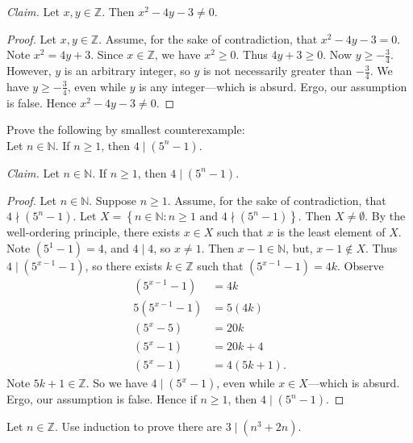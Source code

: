 \documentclass{article}
\newcommand{\Z}{\mathbb{Z}}
\theoremstyle{definition}
\begin{document}
\begin{solution}
\newline

\noindent\textit{Claim. }Let $x,y\in\Z$. Then $x^2-4y-3\neq 0$.
\begin{proof}
Let $x,y\in\Z$. Assume, for the sake of contradiction, that $x^2-4y-3=0$. Note $x^2=4y+3$. Since $x\in\Z$, we have $x^2\geq 0$. Thus $4y+3\geq 0$. Now $y\geq-\frac{3}{4}$. However, $y$ is an arbitrary integer, so $y$ is not necessarily greater than $-\frac{3}{4}$. We have $y\geq-\frac{3}{4}$, even while $y$ is any integer---which is absurd. Ergo, our assumption is false. Hence $x^2-4y-3\neq 0$. 
\end{proof}
\end{solution}
\begin{question}
    Prove the following by smallest counterexample:\\
    Let $n\in \mathbb{N}$. If $n\geq 1$, then $4 \mid (5^n-1)$.
\end{question}
\begin{solution}
\newline

\noindent\textit{Claim. }Let $n\in\mathbb{N}$. If $n\geq 1$, then $4\mid(5^n-1)$.
\begin{proof}
Let $n\in\mathbb{N}$. Suppose $n\geq 1$. Assume, for the sake of contradiction, that $4\nmid\left(5^n-1\right)$. Let $X=\left\{n\in\mathbb{N}:n\geq 1\text{ and }4\nmid\left(5^n-1\right)\right\}$. Then $X\neq\emptyset$. By the well-ordering principle, there exists $x\in X$ such that $x$ is the least element of $X$. Note $\left(5^1-1\right)=4$, and $4\mid 4$, so $x\neq 1$. Then $x-1\in\mathbb{N}$, but, $x-1\notin X$. Thus $4\mid\left(5^{x-1}-1\right)$, so there exists $k\in\Z$ such that $\left(5^{x-1}-1\right)=4k$. Observe
\begin{align*}
\left(5^{x-1}-1\right)&=4k\\
5\left(5^{x-1}-1\right)&=5(4k)\\
\left(5^x-5\right)&=20k\\
\left(5^x-1\right)&=20k+4\\
\left(5^x-1\right)&=4(5k+1).
\end{align*}
Note $5k+1\in\Z$. So we have $4\mid\left(5^x-1\right)$, even while $x\in X$---which is absurd. Ergo, our assumption is false. Hence if $n\geq 1$,  then $4\mid\left(5^n-1\right)$.
\end{proof}
\end{solution}
\begin{question}
    Let $n\in \Z$. Use induction to prove there are $3 \mid (n^3+2n)$. 
\end{question}
\end{document}
